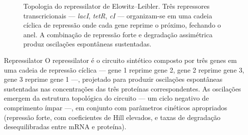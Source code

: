 \begin{figure}[htbp]
\centering
{}
\caption{Topologia do repressilator de Elowitz--Leibler. Três repressores transcricionais --- \textit{lacI}, \textit{tetR}, \textit{cI} --- organizam-se em uma cadeia cíclica de repressão onde cada gene reprime o próximo, fechando o anel. A combinação de repressão forte e degradação assimétrica produz oscilações espontâneas sustentadas.}
\label{fig:14-repressilator}
\end{figure}

\begin{definicao}{Repressilator}
O repressilator é o circuito sintético composto por três genes em uma cadeia de repressão cíclica --- gene 1 reprime gene 2, gene 2 reprime gene 3, gene 3 reprime gene 1 ---, projetado para produzir oscilações espontâneas sustentadas nas concentrações das três proteínas correspondentes. As oscilações emergem da estrutura topológica do circuito --- um ciclo negativo de comprimento ímpar ---, em conjunto com parâmetros cinéticos apropriados (repressão forte, com coeficientes de Hill elevados, e taxas de degradação desequilibradas entre mRNA e proteína).
\end{definicao}

